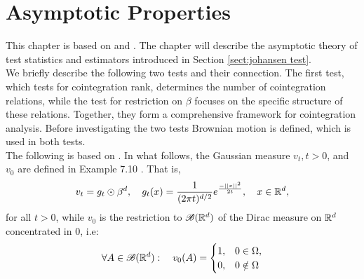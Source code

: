 \section{Asymptotic Properties}
This chapter is based on \cite{Statistica_analysis_of_cointegrating_vectors} and \cite{Modelling_of_cointegration_in_the_vector_autoregressive_model}. The chapter will describe the asymptotic theory of test statistics and estimators introduced in Section \ref{sect:johansen test}.\\

\noindent We briefly describe the following two tests and their connection. The first test, which tests for cointegration rank, determines the number of cointegration relations, while the test for restriction on $\beta$ focuses on the specific structure of these relations. Together, they form a comprehensive framework for cointegration analysis. Before investigating the two tests Brownian motion is defined, which is used in both tests.\\

\noindent 
The following is based on \cite{Measure_theory_integration_theory_and_stochastic_processes}. In what follows, the Gaussian measure $v_t, t>0$, and $v_0$ are defined in Example 7.10 \cite{Measure_theory_integration_theory_and_stochastic_processes}. That is,
\begin{equation*}
    v_t=g_t \odot \beta^d, \quad g_t(x)=\frac{1}{(2\pi t)^{d/2}}e^{\frac{-||x||^2}{2t}}, \quad x\in \mathbb{R}^d,
\end{equation*}
for all $t>0$, while $v_0$ is the restriction to $\mathscr{B}(\mathbb{R}^d)$ of the Dirac measure on $\mathbb{R}^d$ concentrated in 0, i.e:
\begin{equation*}
    \forall A \in \mathscr{B}(\mathbb{R}^d): \quad v_0(A)=\begin{cases} 
1,& 0 \in \Omega, \\
0,& 0 \notin \Omega
\end{cases}
\end{equation*}


